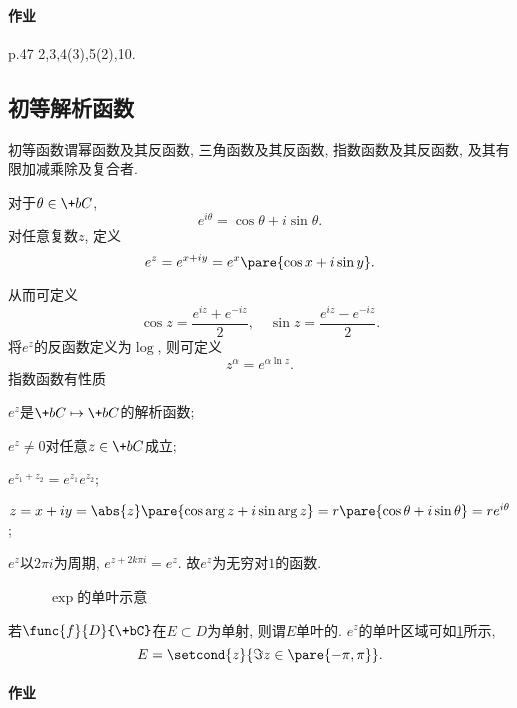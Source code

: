 \documentclass[../ComplexVariable.tex]{subfiles}
\begin{document}
\paragraph{作业} %
\label{par:作业}

p.47 2,3,4(3),5(2),10.



\subsection{初等解析函数} %
\label{sub:初等解析函数}

初等函数谓幂函数及其反函数, 三角函数及其反函数, 指数函数及其反函数, 及其有限加减乘除及复合者.
\begin{finale}
    \begin{definition}[Euler公式]
        对于$\theta\in\+bC$,
        \[ e^{i\theta} = \cos\theta + i\sin\theta. \]
        对任意复数$z$, 定义
        \[ e^z = e^{x+iy} = e^x\pare{\cos x + i\sin y}. \]
    \end{definition}
\end{finale}
从而可定义
\[ \cos z = \frac{e^{iz} + e^{-iz}}{2},\quad \sin z = \frac{e^{iz} - e^{-iz}}{2}.  \]
将$e^z$的反函数定义为$\log$, 则可定义
\[ z^\alpha = e^{\alpha\ln z}. \]
指数函数有性质
\begin{cenum}
    \item $e^z$是$\+bC\mapsto \+bC$的解析函数;
    \item $e^z\neq 0$对任意$z\in\+bC$成立;
    \item $e^{z_1+z_2} = e^{z_1}e^{z_2}$;
    \item $z = x+iy = \abs{z}\pare{\cos\arg z + i\sin\arg z} = r\pare{\cos\theta + i\sin \theta} = re^{i\theta}$;
    \item $e^z$以$2\pi i$为周期, $e^{z+2k\pi i} = e^z$. 故$e^z$为无穷对$1$的函数.
\end{cenum}
\begin{figure}[ht]
    \centering
    \caption{$\exp$的单叶示意}
    \label{fig:exp的单叶示意}
\end{figure}
若$\func{f}{D}{\+bC}$在$E\subset D$为单射, 则谓$E$单叶的. $e^z$的单叶区域可如\cref{fig:exp的单叶示意}所示,
\[ E = \setcond{z}{\Im z \in \pare{-\pi,\pi}}. \]

\paragraph{作业} %
\label{par:作业}
\end{document}
